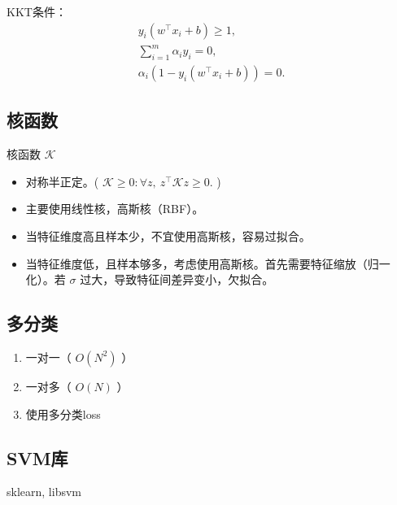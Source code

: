\documentclass[letterpaper,10pt,english]{sphinxmanual}
\begin{document}
KKT条件：
\begin{equation*}
\begin{split}y_i(w^{\top} x_i + b) \geqslant 1, \\
\sum_{i=1}^m \alpha_i y_i = 0,\\
\alpha_i (1 - y_i(w^{\top} x_i + b)) = 0.\end{split}
\end{equation*}

\subsection{核函数}
\label{\detokenize{machineLearning/02_svm:id2}}
核函数 \(\mathcal{K}\)
\begin{itemize}
\item {} 
对称半正定。( \(\mathcal{K} \geqslant 0: \forall z,\  z^{\top}\mathcal{K}z \geqslant 0.\) )

\item {} 
主要使用线性核，高斯核（RBF）。

\item {} 
当特征维度高且样本少，不宜使用高斯核，容易过拟合。

\item {} 
当特征维度低，且样本够多，考虑使用高斯核。首先需要特征缩放（归一化）。若 \(\sigma\) 过大，导致特征间差异变小，欠拟合。

\end{itemize}


\subsection{多分类}
\label{\detokenize{machineLearning/02_svm:id3}}\begin{enumerate}
\item {} 
一对一（ \(O(N^2)\) ）

\item {} 
一对多（ \(O(N)\) ）

\item {} 
使用多分类loss

\end{enumerate}


\subsection{SVM库}
\label{\detokenize{machineLearning/02_svm:svm}}
sklearn, libsvm
\end{document}
